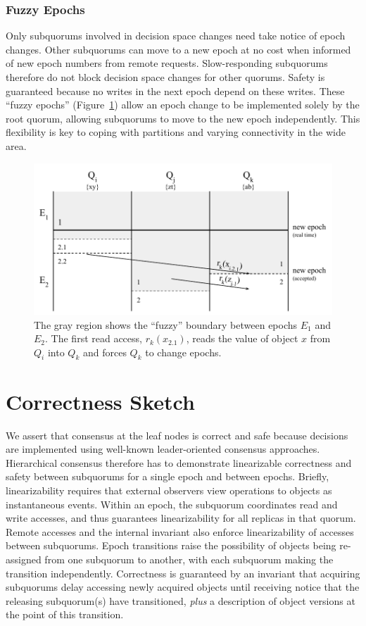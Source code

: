 \documentclass[sigconf]{acmart}
\begin{document}
\subsubsection{Fuzzy Epochs}

Only subquorums involved in decision space changes need take notice of
epoch changes.
Other subquorums can move to a new epoch at no cost when informed of new epoch
numbers from remote requests.
Slow-responding subquorums therefore do not block decision space changes for other
quorums.
Safety is guaranteed because no writes in the next epoch depend on these writes.
These ``fuzzy epochs'' (Figure~\ref{fig:fuzzy}) allow an epoch change to be implemented solely by the
root quorum, allowing subquorums to move to the new epoch independently.
This flexibility is key to coping with partitions and varying connectivity in
the wide area.

\begin{figure}[t]
    \centering
    \includegraphics[height=0.2\textheight]{figures/fuzzy}
    \caption{The gray region shows the ``fuzzy'' boundary between epochs $E_1$
      and $E_2$. The first read access, $r_k(x_{2.1})$, reads the value of object $x$ from $Q_i$ into
      $Q_k$ and forces $Q_k$ to change epochs.}
    \label{fig:fuzzy}
\end{figure}

\section{Correctness Sketch}

We assert that consensus at the leaf nodes is correct and safe because decisions are
implemented using well-known leader-oriented consensus approaches.
Hierarchical consensus therefore has to demonstrate linearizable correctness and safety
between subquorums for a single epoch and between epochs.
Briefly, linearizability requires that external observers view operations to objects as
instantaneous events.
Within an epoch, the subquorum coordinates read and write accesses, and thus guarantees
linearizability for all replicas in that quorum.
Remote accesses and the internal invariant also enforce linearizability of accesses
between subquorums.
Epoch transitions raise the possibility of objects being re-assigned from one subquorum to
another, with each subquorum making the transition independently. Correctness is
guaranteed by an invariant that acquiring subquorums delay accessing newly acquired objects
until receiving notice that the releasing subquorum(s) have transitioned, \emph{plus} a
description of object versions at the point of this transition.
\end{document}
